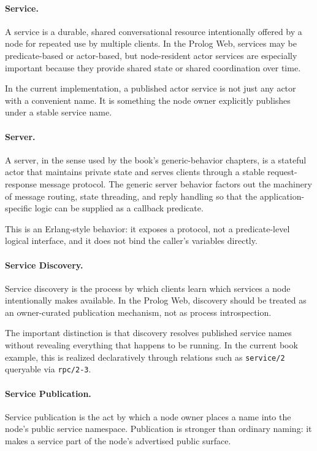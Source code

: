 \paragraph{Service.}
A service is a durable, shared conversational resource intentionally offered by
a node for repeated use by multiple clients. In the Prolog Web, services may be
predicate-based or actor-based, but node-resident actor services are especially
important because they provide shared state or shared coordination over time.

In the current implementation, a published actor service is not just any actor
with a convenient name. It is something the node owner explicitly publishes
under a stable service name.

\paragraph{Server.}
A server, in the sense used by the book's generic-behavior chapters, is a
stateful actor that maintains private state and serves clients through a stable
request-response message protocol. The generic server behavior factors out the
machinery of message routing, state threading, and reply handling so that the
application-specific logic can be supplied as a callback predicate.

This is an Erlang-style behavior: it exposes a protocol, not a predicate-level
logical interface, and it does not bind the caller's variables directly.

\paragraph{Service Discovery.}
Service discovery is the process by which clients learn which services a node
intentionally makes available. In the Prolog Web, discovery should be treated as
an owner-curated publication mechanism, not as process introspection.

The important distinction is that discovery resolves published service names
without revealing everything that happens to be running. In the current book
example, this is realized declaratively through relations such as
\texttt{service/2} queryable via \texttt{rpc/2-3}.

\paragraph{Service Publication.}
Service publication is the act by which a node owner places a name into the
node's public service namespace. Publication is stronger than ordinary naming:
it makes a service part of the node's advertised public surface.

